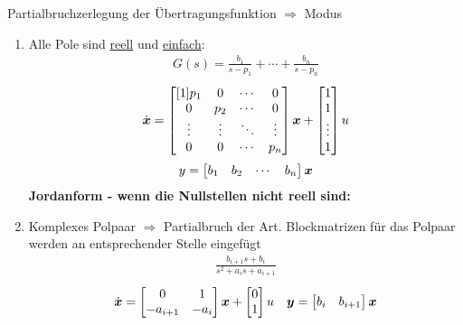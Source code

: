 Partialbruchzerlegung der Übertragungsfunktion $\Rightarrow$ Modus
\\

\begin{enumerate}
	\item Alle Pole sind \underline{reell} und \underline{einfach}:
	\begin{align*}
	G(s) = \frac{b_1}{s-p_1}+ \cdots +\frac{b_n}{s-p_n}
	\end{align*}
	\begin{align*}
	\dot{\boldsymbol{x}} = 
	\begin{bmatrix}[1]
	p_1 & 0 &\cdots & 0 \\
	0&p_2 &\cdots & 0  \\
	\vdots&\vdots&\ddots&\vdots\\
	0&0&\cdots&p_n
	\end{bmatrix}\boldsymbol{x}+ 
	\begin{bmatrix}
	1\\ 1 \\ \vdots \\1
	\end{bmatrix} u 	
	\end{align*}
	\begin{align*}
	y= \begin{bmatrix}
	b_1 & b_2&\cdots &b_n
	\end{bmatrix} \boldsymbol{x}
	\end{align*}
	\textbf{Jordanform -  wenn die Nullstellen nicht reell sind:}
	\item Komplexes Polpaar $\Rightarrow$ Partialbruch der Art.
	Blockmatrizen für das Polpaar werden an entsprechender Stelle eingefügt
	\begin{align*}
		\frac{b_{i+1}s+b_i}{s^2+a_is+a_{i+1}}
	\end{align*}
	\begin{align*}
		\dot{\boldsymbol{x}} = \begin{bmatrix}
			0 & 1\\
			-a_{i+1} & -a_i
		\end{bmatrix}\boldsymbol{x} + \begin{bmatrix}
		0\\1
		\end{bmatrix}u & & \boldsymbol{y} = \begin{bmatrix}
		b_i & b_{i+1}
		\end{bmatrix}\boldsymbol{x}
	\end{align*}
	

\end{enumerate}
